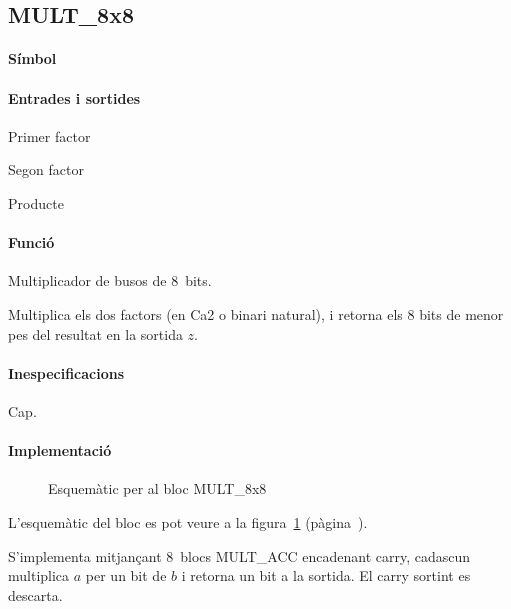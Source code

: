 \subsection{\label{sub:\projectname-MULT_8x8} \textsf{MULT\_8x8}}

\paragraph{Símbol}
\begin{center}  \end{center}

\paragraph{Entrades i sortides}

\begin{where}
\item[\nodenamerange{a}{7}{0}] Primer factor
\item[\nodenamerange{b}{7}{0}] Segon factor
\item[\nodenamerange{z}{7}{0}] Producte
\end{where}

\paragraph{Funció}

Multiplicador de busos de 8~bits.

Multiplica els dos factors (en Ca2 o binari natural), i retorna els 8 bits de menor pes del resultat en la sortida $z$.

\paragraph{Inespecificacions}

Cap.

\paragraph{Implementació}

\begin{figure}[b]
  \begin{center}
  \end{center}
  \caption{\label{fig:\projectname-MULT_8x8} Esquemàtic per al bloc \textsf{MULT\_8x8}}
\end{figure}

L'esquemàtic del bloc es pot veure a la figura~\ref{fig:\projectname-MULT_8x8} (pàgina~\pageref{fig:\projectname-MULT_8x8}).

S'implementa mitjançant 8~blocs \textsf{MULT\_ACC} encadenant carry, cadascun multiplica $a$ per un bit de $b$ i retorna un bit a la sortida. El carry sortint
es descarta.

\vspace{1cm}
